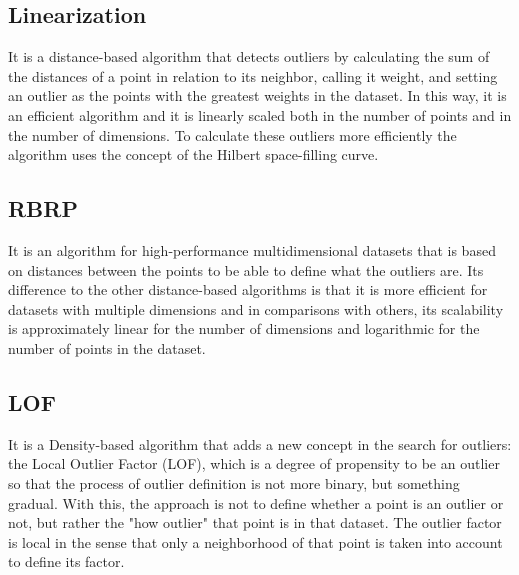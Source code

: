 \subsection{Linearization}

It is a distance-based algorithm that detects outliers by calculating the sum of the distances
of a point in relation to its neighbor, calling it weight, and setting an outlier as the points
with the greatest weights in the dataset. In this way, it is an efficient algorithm and it is
linearly scaled both in the number of points and in the number of dimensions. To calculate these
outliers more efficiently the algorithm uses the concept of the Hilbert space-filling curve.

\subsection{RBRP}

It is an algorithm for high-performance multidimensional datasets that is based on
distances between the points to be able to define what the outliers are. Its difference
to the other distance-based algorithms is that it is more efficient for datasets with
multiple dimensions and in comparisons with others, its scalability is approximately
linear for the number of dimensions and logarithmic for the number of points in the
dataset.

\subsection{LOF}

It is a Density-based algorithm that adds a new concept in the search for outliers: the
Local Outlier Factor (LOF), which is a degree of propensity to be an outlier so that the
process of outlier definition is not more binary, but something gradual. With this, the
approach is not to define whether a point is an outlier or not, but rather the "how outlier"
that point is in that dataset. The outlier factor is local in the sense that only a neighborhood
of that point is taken into account to define its factor.




